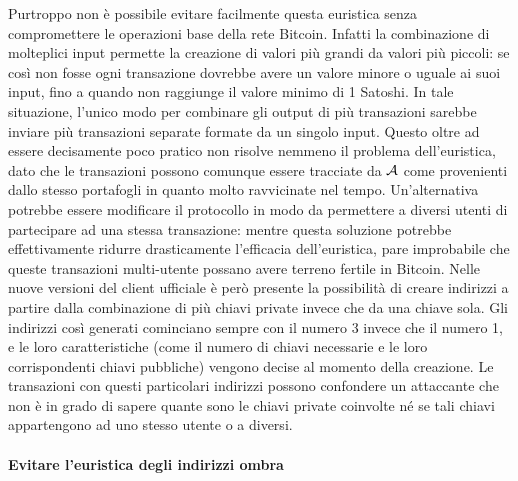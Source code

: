Purtroppo non è possibile evitare facilmente questa euristica senza compromettere le operazioni base della rete Bitcoin.
Infatti la combinazione di molteplici input permette la creazione di valori più grandi da valori più piccoli: se così non fosse ogni transazione dovrebbe avere un valore minore o uguale ai suoi input, fino a quando non raggiunge il valore minimo di 1 Satoshi. In tale situazione, l'unico modo per combinare gli output di più transazioni sarebbe inviare più transazioni separate formate da un singolo input. Questo oltre ad essere decisamente poco pratico non risolve nemmeno il problema dell'euristica, dato che le transazioni possono comunque essere tracciate da $\mathcal{A}$ come provenienti dallo stesso portafogli in quanto molto ravvicinate nel tempo.
Un'alternativa potrebbe essere modificare il protocollo in modo da permettere a diversi utenti di partecipare ad una stessa transazione: mentre questa soluzione potrebbe effettivamente ridurre drasticamente l'efficacia dell'euristica, pare improbabile che queste transazioni multi-utente possano avere terreno fertile in Bitcoin.
Nelle nuove versioni del client ufficiale è però presente la possibilità di creare indirizzi a partire dalla combinazione di più chiavi private invece che da una chiave sola. Gli indirizzi così generati cominciano sempre con il numero 3 invece che il numero 1, e le loro caratteristiche (come il numero di chiavi necessarie e le loro corrispondenti chiavi pubbliche) vengono decise al momento della creazione. Le transazioni con questi particolari indirizzi possono confondere un attaccante che non è in grado di sapere quante sono le chiavi private coinvolte né se tali chiavi appartengono ad uno stesso utente o a diversi.

\paragraph{Evitare l'euristica degli indirizzi ombra}

